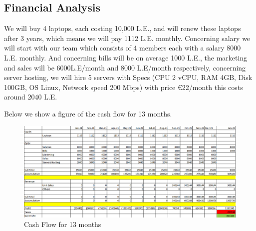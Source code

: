 \subsection{Financial Analysis}

We will buy 4 laptops, each costing 10,000 L.E., and will renew these laptops after 3 years, which means we will pay 1112 L.E. monthly. Concerning salary we will start with our team which consists of 4 members each with a salary 8000 L.E. monthly. And concerning bills will be on average 1000 L.E., the marketing and sales will be 6000L.E/month and 8000 L.E/month respectively, concerning server hosting, we will hire 5 servers with Specs (CPU 2 vCPU, RAM 4GB, Disk 100GB, OS Linux, Network speed 200 Mbps) with price €22/month\cite{Server pricing} this costs around 2040 L.E. \newline

Below we show a figure of the cash flow for 13 months.

\begin{figure}[h!]
\centering
\includegraphics[width=1.1\textwidth]{images/Cash_flow.png}
\caption{Cash Flow for 13 months}
\label{Cash Flow for 13 months}
\end{figure}